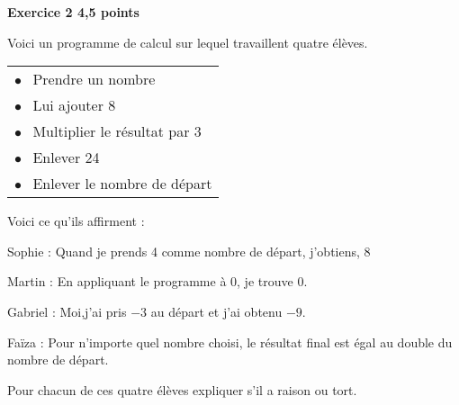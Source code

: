 \textbf{Exercice 2 \hfill 4,5 points}

\medskip

Voici un programme de calcul sur lequel travaillent quatre élèves.

\begin{center}
\begin{tabularx}{0.4\linewidth}{|X|}\hline
$\bullet~~$ Prendre un nombre\\
$\bullet~~$ Lui ajouter 8\\
$\bullet~~$ Multiplier le résultat par 3\\
$\bullet~~$ Enlever 24\\
$\bullet~~$ Enlever le nombre de départ\\\hline
\end{tabularx}
\end{center}

Voici ce qu'ils affirment :

Sophie : \og Quand je prends 4 comme nombre de
départ, j'obtiens, 8 \fg

Martin : \og En appliquant le programme à 0, je trouve 0. \fg

Gabriel : \og  Moi,j'ai pris $-3$ au départ et j'ai obtenu $-9$. \fg

Faïza : \og Pour n'importe quel nombre choisi, le résultat final est égal au double du nombre de départ. \fg

Pour chacun de ces quatre élèves expliquer s'il a raison ou tort.

\clearpage

